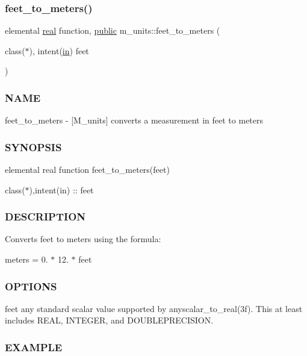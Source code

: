 \mbox{\label{namespacem__units_a6b2e3302766d3ee6edbb2d6d3c284e96}} 
\subsubsection{\texorpdfstring{feet\+\_\+to\+\_\+meters()}{feet\_to\_meters()}}
{\footnotesize\ttfamily elemental \hyperlink{read__watch_83_8txt_abdb62bde002f38ef75f810d3a905a823}{real} function, \hyperlink{M__stopwatch_83_8txt_a2f74811300c361e53b430611a7d1769f}{public} m\+\_\+units\+::feet\+\_\+to\+\_\+meters (\begin{DoxyParamCaption}\item[{class($\ast$), intent(\hyperlink{M__journal_83_8txt_afce72651d1eed785a2132bee863b2f38}{in})}]{feet }\end{DoxyParamCaption})}



\subsubsection*{N\+A\+ME}

feet\+\_\+to\+\_\+meters -\/ \mbox{[}M\+\_\+units\mbox{]} converts a measurement in feet to meters \subsubsection*{S\+Y\+N\+O\+P\+S\+IS}

elemental real function feet\+\_\+to\+\_\+meters(feet)

class($\ast$),intent(in) \+:\+: feet \subsubsection*{D\+E\+S\+C\+R\+I\+P\+T\+I\+ON}

Converts feet to meters using the formula\+:

meters = 0. $\ast$ 12. $\ast$ feet \subsubsection*{O\+P\+T\+I\+O\+NS}

feet any standard scalar value supported by anyscalar\+\_\+to\+\_\+real(3f). This at least includes R\+E\+AL, I\+N\+T\+E\+G\+ER, and D\+O\+U\+B\+L\+E\+P\+R\+E\+C\+I\+S\+I\+ON. \subsubsection*{E\+X\+A\+M\+P\+LE}

